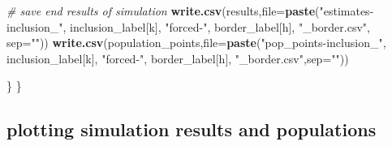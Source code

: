 \documentclass[
]{article}
\newenvironment{Shaded}{\begin{snugshade}}{\end{snugshade}}
\newcommand{\AttributeTok}[1]{\textcolor[rgb]{0.13,0.29,0.53}{#1}}
\newcommand{\CommentTok}[1]{\textcolor[rgb]{0.56,0.35,0.01}{\textit{#1}}}
\newcommand{\FunctionTok}[1]{\textcolor[rgb]{0.13,0.29,0.53}{\textbf{#1}}}
\newcommand{\NormalTok}[1]{#1}
\newcommand{\StringTok}[1]{\textcolor[rgb]{0.31,0.60,0.02}{#1}}
\begin{document}
\begin{Shaded}
\begin{Highlighting}[]
    \CommentTok{\# save end results of simulation}
    \FunctionTok{write.csv}\NormalTok{(results,}\AttributeTok{file=}\FunctionTok{paste}\NormalTok{(}\StringTok{"estimates{-}inclusion\_"}\NormalTok{,}
\NormalTok{                                 inclusion\_label[k],}
                                 \StringTok{"forced{-}"}\NormalTok{,}
\NormalTok{                                 border\_label[h], }\StringTok{"\_border.csv"}\NormalTok{,}
                                 \AttributeTok{sep=}\StringTok{""}\NormalTok{))}
    \FunctionTok{write.csv}\NormalTok{(population\_points,}\AttributeTok{file=}\FunctionTok{paste}\NormalTok{(}\StringTok{"pop\_points{-}inclusion\_"}\NormalTok{,}
\NormalTok{                                           inclusion\_label[k],}
                                           \StringTok{"forced{-}"}\NormalTok{,}
\NormalTok{                                           border\_label[h],}
                                           \StringTok{"\_border.csv"}\NormalTok{,}\AttributeTok{sep=}\StringTok{""}\NormalTok{))}

\NormalTok{  \}}
\NormalTok{\}}
\end{Highlighting}
\end{Shaded}

\subsection{plotting simulation results and
populations}\label{plotting-simulation-results-and-populations}
\end{document}
